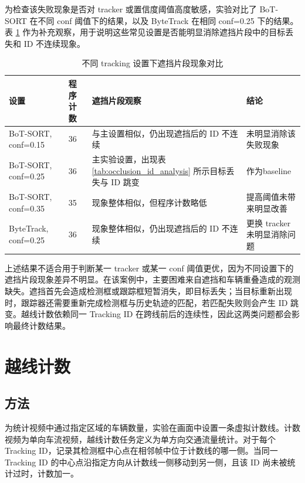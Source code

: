 \documentclass[UTF8,a4paper,12pt]{ctexart}
\begin{document}
为检查该失败现象是否对 tracker 或置信度阈值高度敏感，实验对比了 BoT-SORT 在不同 conf 阈值下的结果，以及 ByteTrack 在相同 conf=0.25 下的结果。表 \ref{tab:tracking_setting_comparison} 作为补充观察，用于说明这些常见设置是否能明显消除遮挡片段中的目标丢失和 ID 不连续现象。

\begin{table}[H]
    \centering
    \caption{不同 tracking 设置下遮挡片段现象对比}
    \label{tab:tracking_setting_comparison}
    \begin{tabular}{lp{1.6cm}p{4.1cm}p{4.1cm}}
        \toprule
        设置 & 程序计数 & 遮挡片段观察 & 结论 \\
        \midrule
        BoT-SORT, conf=0.15 & 36 & 与主设置相似，仍出现遮挡后的 ID 不连续 & 未明显消除该失败现象 \\
        BoT-SORT, conf=0.25 & 36 & 主实验设置，出现表 \ref{tab:occlusion_id_analysis} 所示目标丢失与 ID 跳变 & 作为baseline \\
        BoT-SORT, conf=0.35 & 35 & 现象整体相似，但程序计数略低 & 提高阈值未带来明显改善 \\
        ByteTrack, conf=0.25 & 36 & 现象整体相似，仍出现遮挡后的 ID 不连续 & 更换 tracker 未明显消除问题 \\
        \bottomrule
    \end{tabular}
\end{table}

上述结果不适合用于判断某一 tracker 或某一 conf 阈值更优，因为不同设置下的遮挡片段现象差异不明显。在该案例中，主要困难来自遮挡和车辆重叠造成的观测缺失。遮挡首先会造成检测框或跟踪框短暂消失，即目标丢失；当目标重新出现时，跟踪器还需要重新完成检测框与历史轨迹的匹配，若匹配失败则会产生 ID 跳变。越线计数依赖同一 Tracking ID 在跨线前后的连续性，因此这两类问题都会影响最终计数结果。

\section{越线计数}

\subsection{方法}

为统计视频中通过指定区域的车辆数量，实验在画面中设置一条虚拟计数线。计数视频为单向车流视频，越线计数任务定义为单方向交通流量统计。对于每个 Tracking ID，记录其检测框中心点在相邻帧中位于计数线的哪一侧。当同一 Tracking ID 的中心点沿指定方向从计数线一侧移动到另一侧，且该 ID 尚未被统计过时，计数加一。
\end{document}
